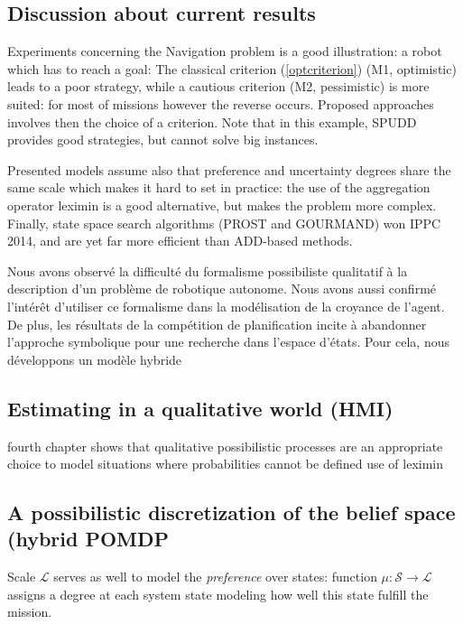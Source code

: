 \subsection*{Discussion about current results}
Experiments  
concerning the Navigation problem
is a good illustration: 
a robot which has to
reach a goal:
The classical criterion (\ref{optcriterion})
(M1, optimistic) 
leads to a poor strategy, 
while a cautious criterion (M2, pessimistic)
is more suited: 
for most of missions however 
the reverse occurs.
Proposed approaches involves then 
the choice of a criterion.
Note that in this example, 
SPUDD provides good strategies, but 
cannot solve big instances. 

Presented models 
assume also that preference
and uncertainty degrees
share the same scale
which makes it hard to
set in practice: the use of
the aggregation operator leximin 
is a good alternative,
but makes the problem more complex.
Finally, state space search algorithms
(PROST \cite{conf/aips/KellerE12} and GOURMAND) won IPPC 2014,
and are yet far more efficient than ADD-based methods.

Nous avons observ\'e la difficult\'e du formalisme possibiliste qualitatif \`a la
description d'un probl\`eme de robotique autonome. Nous avons aussi confirm\'e
l'int\'er\^et d'utiliser ce formalisme dans la mod\'elisation de la croyance de l'agent.
De plus, les r\'esultats de la comp\'etition de planification incite \`a abandonner l'approche symbolique pour
une recherche dans l'espace d'\'etats. Pour cela, nous d\'eveloppons un mod\`ele hybride

\subsection*{Estimating in a qualitative world (HMI)}
fourth chapter shows that 
qualitative possibilistic processes
are an appropriate choice
to model situations 
where probabilities 
cannot be defined
use of leximin

\subsection*{A possibilistic discretization of the belief space (hybrid POMDP}
Scale $\mathcal{L}$ serves as well to model 
the \emph{preference} over states: 
function $\mu: \mathcal{S} \rightarrow \mathcal{L}$ assigns a degree
at each system state modeling how well this state fulfill the mission. 


